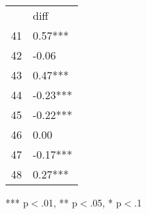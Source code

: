 \documentclass{article}
\begin{document}
\begin{table}[!h]
\centering
\begin{tabular}{ll}
\cline{1-2}
\multicolumn{1}{|l}{} &
  \multicolumn{1}{|l|}{diff} \\
\cline{1-2}
\multicolumn{1}{|l}{41} &
  \multicolumn{1}{|l|}{0.57***} \\
\cline{1-2}
\multicolumn{1}{|l}{42} &
  \multicolumn{1}{|l|}{-0.06} \\
\cline{1-2}
\multicolumn{1}{|l}{43} &
  \multicolumn{1}{|l|}{0.47***} \\
\cline{1-2}
\multicolumn{1}{|l}{44} &
  \multicolumn{1}{|l|}{-0.23***} \\
\cline{1-2}
\multicolumn{1}{|l}{45} &
  \multicolumn{1}{|l|}{-0.22***} \\
\cline{1-2}
\multicolumn{1}{|l}{46} &
  \multicolumn{1}{|l|}{0.00} \\
\cline{1-2}
\multicolumn{1}{|l}{47} &
  \multicolumn{1}{|l|}{-0.17***} \\
\cline{1-2}
\multicolumn{1}{|l}{48} &
  \multicolumn{1}{|l|}{0.27***} \\
\cline{1-2}
\end{tabular}

\footnotesize{
*** p$<$.01, ** p$<$.05, * p$<$.1
}
\end{table}
\end{document}
